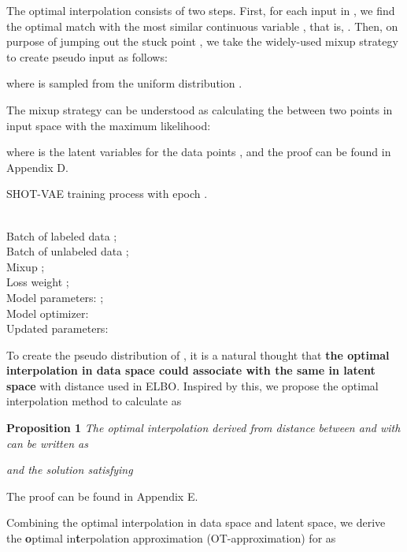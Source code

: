 \documentclass[letterpaper]{article}
\begin{document}
The optimal interpolation consists of two steps. First, for each input  in , we find the optimal match  with the most similar continuous variable , that is,  . Then, on purpose of jumping out the stuck point , we take the widely-used mixup strategy \citep{DBLP:conf/iclr/ZhangCDL18} to create pseudo input  as follows:

where  is sampled from the uniform distribution . 

The mixup strategy can be understood as calculating the  between two points  in input space with the maximum likelihood:

where  is the latent variables for the data points , and the proof can be found in Appendix D.
\begin{algorithm}[t] 
\caption{SHOT-VAE training process with epoch .} 
\label{alg:SHOT-VAE} 
\begin{algorithmic}[1] 
\REQUIRE ~~\\ Batch of labeled data ;\\ Batch of unlabeled data ;\\
Mixup ;\\
Loss weight ;\\
Model parameters: ;\\ 
Model optimizer: 
\ENSURE ~~\\ Updated parameters: 
\STATE 
\STATE 
\STATE 
\STATE 
\STATE 
\end{algorithmic}
\end{algorithm}

To create the pseudo distribution  of , it is a natural thought that \textbf{the optimal interpolation in data space could associate with the same in latent space} with  distance used in ELBO. Inspired by this, we propose the optimal interpolation method to calculate  as

\textbf{Proposition 1} \textit{The optimal interpolation derived from  distance between  and   with  can be written as}

\textit{and the solution  satisfying}

The proof can be found in Appendix E. 

Combining the optimal interpolation in data space and latent space, we derive the \textbf{o}ptimal in\textbf{t}erpolation approximation (OT-approximation) for  as
\end{document}
